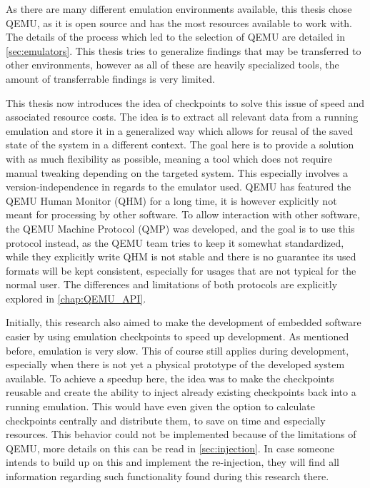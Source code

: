 As there are many different emulation environments available,
this thesis chose QEMU, as it is open source and has the most resources available to work with.
The details of the process which led to the selection of QEMU are detailed in \autoref{sec:emulators}.
This thesis tries to generalize findings that may be transferred to other environments,
however as all of these are heavily specialized tools,
the amount of transferrable findings is very limited.

This thesis now introduces the idea of checkpoints to solve this issue of speed and associated resource costs.
The idea is to extract all relevant data from a running emulation
and store it in a generalized way which allows for reusal of the saved state of the system in a different context.
The goal here is to provide a solution with as much flexibility as possible,
meaning a tool which does not require manual tweaking depending on the targeted system.
This especially involves a version-independence in regards to the emulator used.
QEMU has featured the QEMU Human Monitor (QHM) for a long time,
it is however explicitly not meant for processing by other software.
To allow interaction with other software, the QEMU Machine Protocol (QMP) was developed, and the goal is to use this protocol instead,
as the QEMU team tries to keep it somewhat standardized,
while they explicitly write QHM is not stable and there is no guarantee its used formats will be kept consistent,
especially for usages that are not typical for the normal user.
The differences and limitations of both protocols are explicitly explored in \autoref{chap:QEMU_API}.

Initially, this research also aimed to make the development of embedded software easier by using emulation checkpoints to speed up development.
As mentioned before, emulation is very slow.
This of course still applies during development, especially when there is not yet a physical prototype of the developed system available.
To achieve a speedup here, the idea was to make the checkpoints reusable
and create the ability to inject already existing checkpoints back into a running emulation.
This would have even given the option to calculate checkpoints centrally and distribute them,
to save on time and especially resources.
This behavior could not be implemented because of the  limitations of QEMU,
more details on this can be read in \autoref{sec:injection}.
In case someone intends to build up on this and implement the re-injection,
they will find all information regarding such functionality found during this research there.

